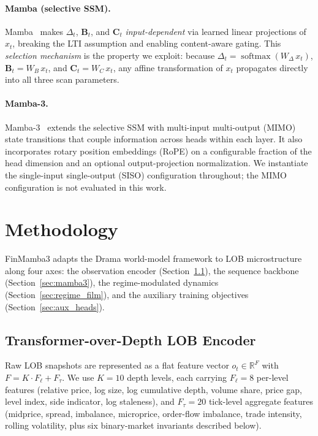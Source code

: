 \documentclass{article}
\newcommand{\R}{\mathbb{R}}
\newcommand{\ot}{o_t}
\DeclareMathOperator{\softmax}{softmax}
\begin{document}
\paragraph{Mamba (selective SSM).}
Mamba~\citep{gu2024mamba} makes $\Delta_t$, $\mathbf{B}_t$, and
$\mathbf{C}_t$ \emph{input-dependent} via learned linear projections of
$x_t$, breaking the LTI assumption and enabling content-aware gating.
This \emph{selection mechanism} is the property we exploit: because
$\Delta_t = \softmax(W_\Delta\,x_t)$, $\mathbf{B}_t = W_B\,x_t$, and
$\mathbf{C}_t = W_C\,x_t$, any affine transformation of $x_t$ propagates
directly into all three scan parameters.

\paragraph{Mamba-3.}
Mamba-3~\citep{lahoti2026mamba3} extends the selective SSM with
multi-input multi-output (MIMO) state transitions that couple
information across heads within each layer.  It also incorporates rotary
position embeddings (RoPE) on a configurable fraction of the head
dimension and an optional output-projection normalization.  We
instantiate the single-input single-output (SISO) configuration
throughout; the MIMO configuration is not evaluated in this work.

\section{Methodology}\label{sec:method}

FinMamba3 adapts the Drama world-model framework to LOB microstructure
along four axes: the observation encoder
(Section~\ref{sec:lob_encoder}), the sequence backbone
(Section~\ref{sec:mamba3}), the regime-modulated dynamics
(Section~\ref{sec:regime_film}), and the auxiliary training objectives
(Section~\ref{sec:aux_heads}).

\subsection{Transformer-over-Depth LOB Encoder}\label{sec:lob_encoder}

Raw LOB snapshots are represented as a flat feature vector
$\ot \in \R^F$ with $F = K \cdot F_{\ell} + F_{\tau}$.  We use
$K = 10$ depth levels, each carrying $F_{\ell} = 8$ per-level features
(relative price, log size, log cumulative depth, volume share, price
gap, level index, side indicator, log staleness), and
$F_{\tau} = 20$ tick-level aggregate features (midprice, spread,
imbalance, microprice, order-flow imbalance, trade intensity, rolling
volatility, plus six binary-market invariants described below).
\end{document}
